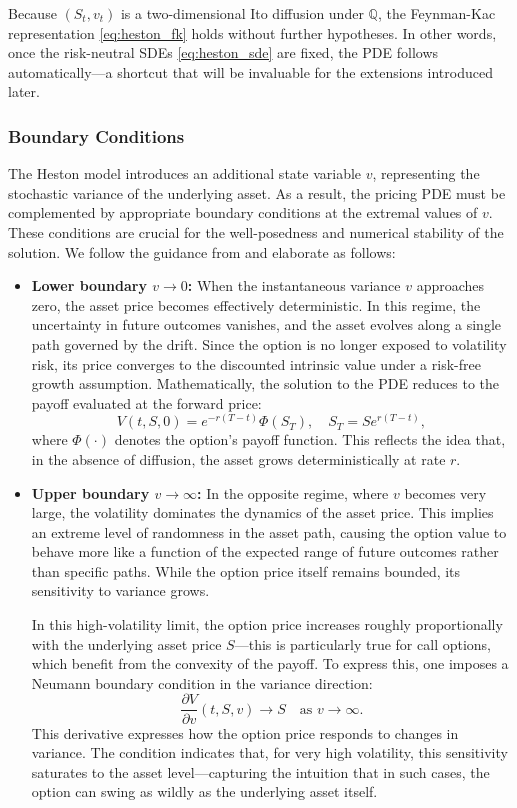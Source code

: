 \documentclass[12pt]{report} %
\theoremstyle{plain} %
\theoremstyle{definition} %
\theoremstyle{remark} %
\begin{document}
Because $(S_t,v_t)$ is a two-dimensional Ito diffusion under $\mathbb Q$, the Feynman-Kac
representation \eqref{eq:heston_fk} holds without further hypotheses. In other words, once the
risk-neutral SDEs \eqref{eq:heston_sde} are fixed, the PDE follows automatically—a shortcut that
will be invaluable for the extensions introduced later.

\subsubsection{Boundary Conditions}

The Heston model introduces an additional state variable $v$, representing the stochastic 
variance of the underlying asset. As a result, the pricing PDE must be complemented by 
appropriate boundary conditions at the extremal values of $v$. These conditions are 
crucial for the well-posedness and numerical stability of the solution. We follow the 
guidance from \cite{duffy2022numerical} and elaborate as follows:

\begin{itemize}
    \item \textbf{Lower boundary $v \to 0$:} 
    When the instantaneous variance $v$ approaches zero, the asset price becomes 
	effectively deterministic. In this regime, the uncertainty in future outcomes 
	vanishes, and the asset evolves along a single path governed by the drift. Since the 
	option is no longer exposed to volatility risk, its price converges to the 
	discounted intrinsic value under a risk-free growth assumption. Mathematically, the 
	solution to the PDE reduces to the payoff evaluated at the forward price:
    \[
        V(t, S, 0) = e^{-r(T - t)} \Phi(S_T), \quad S_T = S e^{r(T - t)},
    \]
    where $\Phi(\cdot)$ denotes the option's payoff function. This reflects the idea that, 
	in the absence of diffusion, the asset grows deterministically at rate $r$.

    \item \textbf{Upper boundary $v \to \infty$:} 
    In the opposite regime, where $v$ becomes very large, the volatility dominates the 
	dynamics of the asset price. This implies an extreme level of randomness in the asset path, 
	causing the option value to behave more like a function of the expected range of future 
	outcomes rather than specific paths. While the option price itself remains bounded, its 
	sensitivity to variance grows. 

    In this high-volatility limit, the option price increases roughly proportionally with 
	the underlying asset price $S$—this is particularly true for call options, which benefit 
	from the convexity of the payoff. To express this, one imposes a Neumann boundary condition 
	in the variance direction:
    \[
        \frac{\partial V}{\partial v}(t, S, v) \to S \quad \text{as } v \to \infty.
    \]
    This derivative expresses how the option price responds to changes in variance. The 
	condition indicates that, for very high volatility, this sensitivity saturates to the 
	asset level—capturing the intuition that in such cases, the option can swing as wildly 
	as the underlying asset itself.

\end{itemize}
\end{document}
